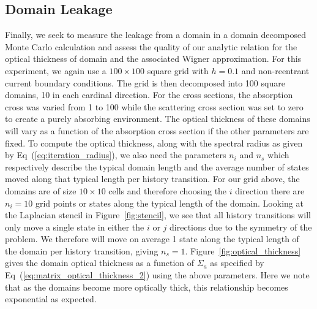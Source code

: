 \documentclass[letterpaper,12pt]{article}
\begin{document}
\subsection{Domain Leakage}
Finally, we seek to measure the leakage from a domain in a domain
decomposed Monte Carlo calculation and assess the quality of our
analytic relation for the optical thickness of domain and the
associated Wigner approximation. For this experiment, we again use a
$100 \times 100$ square grid with $h=0.1$ and non-reentrant current
boundary conditions. The grid is then decomposed into 100 square
domains, 10 in each cardinal direction. For the cross sections, the
absorption cross was varied from 1 to 100 while the scattering cross
section was set to zero to create a purely absorbing environment. The
optical thickness of these domains will vary as a function of the
absorption cross section if the other parameters are fixed. To compute
the optical thickness, along with the spectral radius as given by
Eq~(\ref{eq:iteration_radius}), we also need the parameters $n_i$ and
$n_s$ which respectively describe the typical domain length and the
average number of states moved along that typical length per history
transition. For our grid above, the domains are of size $10 \times 10$
cells and therefore choosing the $i$ direction there are $n_i=10$ grid
points or states along the typical length of the domain. Looking at
the Laplacian stencil in Figure~\ref{fig:stencil}, we see that all
history transitions will only move a single state in either the $i$ or
$j$ directions due to the symmetry of the problem. We therefore will
move on average 1 state along the typical length of the domain per
history transition, giving $n_s=1$. Figure~\ref{fig:optical_thickness}
gives the domain optical thickness as a function of $\Sigma_a$ as
specified by Eq~(\ref{eq:matrix_optical_thickness_2}) using the above
parameters. Here we note that as the domains become more optically
thick, this relationship becomes exponential as expected.
\end{document}
